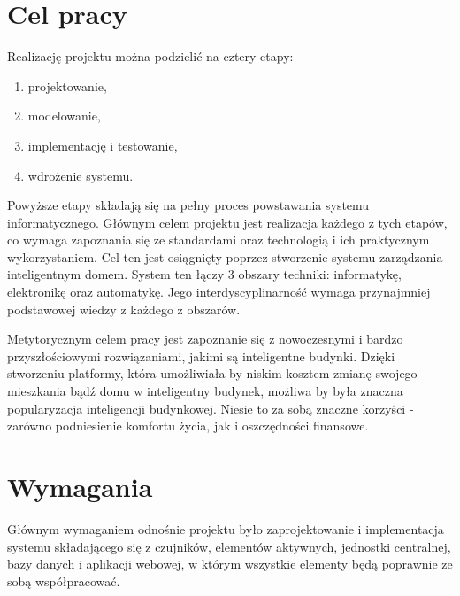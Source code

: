 \documentclass[eng,oneside]{mgr}
\begin{document}
\section{Cel pracy}
Realizację projektu można podzielić na cztery etapy:
\begin{enumerate}
	\item projektowanie,
	\item modelowanie,
	\item implementację i testowanie,
	\item wdrożenie systemu.
\end{enumerate}
Powyższe etapy składają się na pełny proces powstawania systemu informatycznego. Głównym celem projektu jest realizacja każdego z tych etapów, co wymaga zapoznania się ze standardami oraz technologią i ich praktycznym wykorzystaniem. Cel ten jest osiągnięty poprzez stworzenie systemu zarządzania inteligentnym domem. System ten łączy 3 obszary techniki: informatykę, elektronikę oraz automatykę. Jego interdyscyplinarność wymaga przynajmniej podstawowej wiedzy z każdego z obszarów.

Metytorycznym celem pracy jest zapoznanie się z nowoczesnymi i bardzo przyszłościowymi rozwiązaniami, jakimi są inteligentne budynki. Dzięki stworzeniu platformy, która umożliwiała by niskim kosztem zmianę swojego mieszkania bądź domu w inteligentny budynek, możliwa by była znaczna popularyzacja inteligencji budynkowej. Niesie to za sobą znaczne korzyści - zarówno podniesienie komfortu życia, jak i oszczędności finansowe.

\section{Wymagania}
Głównym wymaganiem odnośnie projektu było zaprojektowanie i implementacja systemu składającego się z czujników, elementów aktywnych, jednostki centralnej, bazy danych i aplikacji webowej, w którym wszystkie elementy będą poprawnie ze sobą współpracować.
\end{document}
